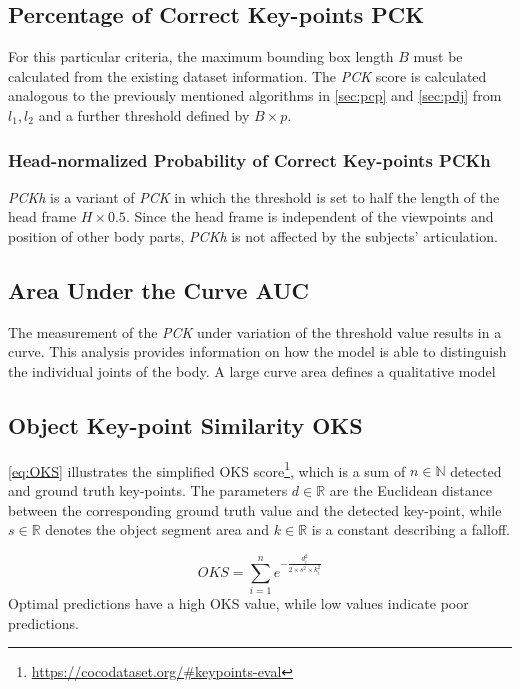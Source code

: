 \subsection{Percentage of Correct Key-points PCK}
For this particular criteria, the maximum bounding box length $B$ must be calculated from the existing dataset information. The \emph{PCK} score is calculated analogous to the previously mentioned algorithms in \autoref{sec:pcp} and \autoref{sec:pdj} from $l_{1}, l_{2}$ and a further threshold defined by $B \times p$. \cite{mpii, pck}

\subsubsection{Head-normalized Probability of Correct Key-points PCKh}
\emph{PCKh} is a variant of \emph{PCK} in which the threshold is set to half the length of the head frame $H \times 0.5$. Since the head frame is independent of the viewpoints and position of other body parts, \emph{PCKh} is not affected by the subjects' articulation. \cite{mpii}

\subsection{Area Under the Curve AUC}
The measurement of the \emph{PCK} under variation of the threshold value results in a curve. This analysis provides information on how the model is able to distinguish the individual joints of the body. A large curve area defines a qualitative model %

\subsection{Object Key-point Similarity OKS}
\autoref{eq:OKS} illustrates the simplified OKS score\footnote{\url{https://cocodataset.org/\#keypoints-eval}}, which is a sum of $ n \in \mathbb{N}$ detected and ground truth key-points. The parameters $d \in \mathbb{R}$ are the Euclidean distance between the corresponding ground truth value and the detected key-point, while $s \in \mathbb{R}$ denotes the object segment area and $k \in \mathbb{R}$ is a constant describing a falloff. 

\begin{equation}
    \label{eq:OKS}
    OKS = \sum_{i=1}^{n} e^{- \frac{d_{i}^{2}}{2 \times s^{2} \times k_{i}^{2}}}
\end{equation}
Optimal predictions have a high OKS value, while low values indicate poor predictions. 

